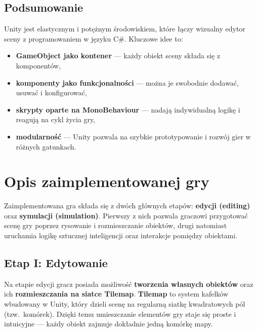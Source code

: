 \documentclass[a4paper,12pt]{book} %
\begin{document}
\subsection*{Podsumowanie}

Unity jest elastycznym i potężnym środowiskiem, 
które łączy wizualny edytor sceny z programowaniem w języku C\#.  
Kluczowe idee to:
\begin{itemize}
  \item \textbf{GameObject jako kontener} — każdy obiekt sceny składa się z komponentów,
  \item \textbf{komponenty jako funkcjonalności} — można je swobodnie dodawać, usuwać i konfigurować,
  \item \textbf{skrypty oparte na MonoBehaviour} — nadają indywidualną logikę i reagują na cykl życia gry,
  \item \textbf{modularność} — Unity pozwala na szybkie prototypowanie i rozwój gier w różnych gatunkach.
\end{itemize}


\section{Opis zaimplementowanej gry}

Zaimplementowana gra składa się z dwóch głównych etapów: 
\textbf{edycji (editing)} oraz \textbf{symulacji (simulation)}. 
Pierwszy z nich pozwala graczowi przygotować scenę gry poprzez rysowanie i rozmieszczanie obiektów, 
drugi natomiast uruchamia logikę sztucznej inteligencji oraz interakcje pomiędzy obiektami.  

\subsection{Etap I: Edytowanie}

Na etapie edycji gracz posiada możliwość \textbf{tworzenia własnych obiektów} oraz ich \textbf{rozmieszczania na siatce Tilemap}.  
\textbf{Tilemap} to system kafelków wbudowany w Unity, który dzieli scenę na regularną siatkę kwadratowych pól (tzw.\ komórek). 
Dzięki temu umieszczanie elementów gry staje się proste i intuicyjne — każdy obiekt zajmuje dokładnie jedną komórkę mapy.  
\end{document}
